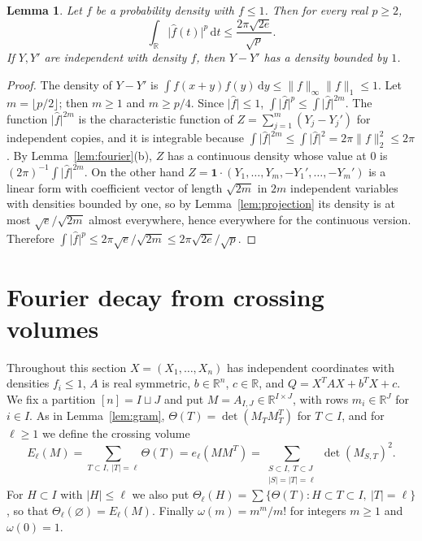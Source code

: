 \documentclass[11pt]{amsart}
\numberwithin{equation}{section}
\newtheorem{lemma}[theorem]{Lemma}
\theoremstyle{definition}
\theoremstyle{remark}
\newcommand{\R}{\mathbb R}
\newcommand{\1}{\mathbf 1}
\newcommand{\dd}{\,\mathrm d}
\newcommand{\norm}[1]{\lVert #1\rVert}
\newcommand{\abs}[1]{\lvert #1\rvert}
\begin{document}
\begin{lemma}\label{lem:fpower}
Let $f$ be a probability density with $f\le1$. Then for every real $p\ge2$,
\[
\int_\R\abs{\widehat f(t)}^p\dd t\le\frac{2\pi\sqrt{2e}}{\sqrt p}.
\]
If $Y,Y'$ are independent with density $f$, then $Y-Y'$ has a density bounded by $1$.
\end{lemma}

\begin{proof}
The density of $Y-Y'$ is $\int f(x+y)f(y)\dd y\le\norm f_\infty\norm f_1\le1$. Let $m=\lfloor p/2\rfloor$; then $m\ge1$ and $m\ge p/4$. Since $\abs{\widehat f}\le1$, $\int\abs{\widehat f}^p\le\int\abs{\widehat f}^{2m}$. The function $\abs{\widehat f}^{2m}$ is the characteristic function of $Z=\sum_{j=1}^m(Y_j-Y_j')$ for independent copies, and it is integrable because $\int\abs{\widehat f}^{2m}\le\int\abs{\widehat f}^2=2\pi\norm f_2^2\le2\pi$. By Lemma~\ref{lem:fourier}(b), $Z$ has a continuous density whose value at $0$ is $(2\pi)^{-1}\int\abs{\widehat f}^{2m}$. On the other hand $Z=\mathbf 1\cdot(Y_1,\dots,Y_m,-Y_1',\dots,-Y_m')$ is a linear form with coefficient vector of length $\sqrt{2m}$ in $2m$ independent variables with densities bounded by one, so by Lemma~\ref{lem:projection} its density is at most $\sqrt e/\sqrt{2m}$ almost everywhere, hence everywhere for the continuous version. Therefore $\int\abs{\widehat f}^{p}\le2\pi\sqrt e/\sqrt{2m}\le2\pi\sqrt{2e}/\sqrt p$.
\end{proof}

\section{Fourier decay from crossing volumes}\label{sec:decay}

Throughout this section $X=(X_1,\dots,X_n)$ has independent coordinates with densities $f_i\le1$, $A$ is real symmetric, $b\in\R^n$, $c\in\R$, and $Q=X^TAX+b^TX+c$. We fix a partition $[n]=I\sqcup J$ and put $M=A_{I,J}\in\R^{I\times J}$, with rows $m_i\in\R^J$ for $i\in I$. As in Lemma~\ref{lem:gram}, $\Theta(T)=\det(M_TM_T^T)$ for $T\subset I$, and for $\ell\ge1$ we define the crossing volume
\[
E_\ell(M)=\sum_{T\subset I,\ \abs T=\ell}\Theta(T)=e_\ell(MM^T)=\sum_{\substack{S\subset I,\ T\subset J\\\abs S=\abs T=\ell}}\det(M_{S,T})^2 .
\]
For $H\subset I$ with $\abs H\le\ell$ we also put $\Theta_\ell(H)=\sum\{\Theta(T):H\subset T\subset I,\ \abs T=\ell\}$, so that $\Theta_\ell(\varnothing)=E_\ell(M)$. Finally $\omega(m)=m^m/m!$ for integers $m\ge1$ and $\omega(0)=1$.
\end{document}
